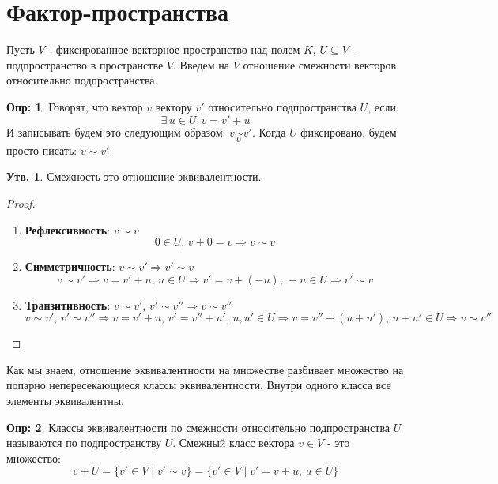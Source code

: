 \documentclass[12pt]{article}
\theoremstyle{definition}
\newtheorem{defn}{Опр:}
\newtheorem{prop}{Утв.}
\begin{document}
\section*{Фактор-пространства}
Пусть $V$ - фиксированное векторное пространство над полем $K$, $U \subseteq V$ - подпространство в пространстве $V$. Введем на $V$ отношение смежности векторов относительно подпространства.

\begin{defn}
	Говорят, что вектор $v$  вектору $v'$ относительно подпространства $U$, если:
	$$
		\exists \, u \in U \colon v = v' + u
	$$
	И записывать будем это следующим образом: $v \underset{U}{\sim} v'$. Когда $U$ фиксировано, будем просто писать: $v \sim v'$.
\end{defn}

\begin{prop}
	Смежность это отношение эквивалентности.
\end{prop}
\begin{proof}\hfill
	\begin{enumerate}[label=\arabic*)]
		\item \textbf{Рефлексивность}: $v \sim v$
		$$
			0 \in U, \, v + 0 = v \Rightarrow v \sim v
		$$
		\item \textbf{Симметричность}: $v \sim v' \Rightarrow  v' \sim v$
		$$
			v \sim v' \Rightarrow v = v' + u, \, u \in U \Rightarrow  v' = v + (-u), \, -u \in U \Rightarrow v' \sim v
		$$
		\item \textbf{Транзитивность}: $v \sim v', \, v' \sim v'' \Rightarrow v \sim v''$
		$$
			v \sim v', \, v' \sim v'' \Rightarrow  v = v' + u,\, v' =v'' + u', \, u,u' \in U \Rightarrow v = v'' + (u + u'), \, u + u' \in U \Rightarrow v \sim v''
		$$
	\end{enumerate}
\end{proof}
Как мы знаем, отношение эквивалентности на множестве разбивает множество на попарно непересекающиеся классы эквивалентности. Внутри одного класса все элементы эквивалентны.
\begin{defn}
	Классы эквивалентности по смежности относительно подпространства $U$ называются  по подпространству $U$. Смежный класс вектора $v \in V$ - это множество: 
	$$
		v +U = \{v' \in V \mid v' \sim v \} = \{v' \in V \mid v'= v + u, \, u \in U \}
	$$
\end{defn}
\end{document}
